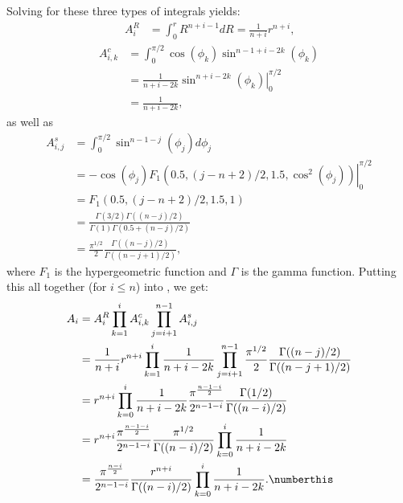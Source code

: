 Solving for these three types of integrals yields:
\begin{align*}
A^R_i &= \int_0^r R^{n+i-1} dR = \frac{1}{n+i} r^{n+i} \text{,}
\end{align*}
\begin{align*}
  A^c_{i,k} &= \int_0^{\pi/2} \cos(\phi_k)\sin^{n-1+i-2k}(\phi_k) \\
  	&= \frac{1}{n+i-2k} \left. \sin^{n+i-2k}(\phi_k)\right|_0^{\pi/2} \\
	&= \frac{1}{n+i-2k}  \text{,}
\end{align*}
as well as
\begin{align*}
  A^s_{i,j} &= \int_0^{\pi/2} \sin^{n-1-j}(\phi_j) d\phi_j \\
  	&= \left. -\cos(\phi_j)F_1(0.5,(j-n+2)/2, 1.5, \cos^2(\phi_j))\right|_0^{\pi/2} \\
	&= F_1(0.5,(j-n+2)/2, 1.5, 1) \\
	&= \frac{\Gamma(3/2)\Gamma((n-j)/2)}{\Gamma(1)\Gamma(0.5+(n-j)/2)}\\
	&= \frac{\pi^{1/2}}{2} \frac{\Gamma((n-j)/2)}{\Gamma((n-j+1)/2)}
       \text{,}
\end{align*}
where $F_1$ is the hypergeometric function and $\Gamma$ is the gamma function.
Putting this all together (for $i \le n$) into , we get:
\begin{align*}
  A_i &= A^R_i \prod_{k=1}^i A^c_{i,k}  \prod_{j=i+1}^{n-1} A^s_{i,j} \\
  	&=  \frac{1}{n+i} r^{n+i} \prod_{k=1}^i \frac{1}{n+i-2k}  \prod_{j=i+1}^{n-1} \frac{\pi^{1/2}}{2}\frac{\Gamma((n-j)/2)}{\Gamma((n-j+1)/2)} \\
	&=  r^{n+i} \prod_{k=0}^i \frac{1}{n+i-2k}  \frac{\pi^{\frac{n-1-i}{2}}}{2^{n-1-i}}\frac{\Gamma(1/2)}{\Gamma((n-i)/2)} \\
	&=  r^{n+i} \frac{\pi^\frac{n-1-i}{2}}{2^{n-1-i}}\frac{\pi^{1/2}}{\Gamma((n-i)/2)} \prod_{k=0}^i \frac{1}{n+i-2k} \\
	&=   \frac{\pi^\frac{n-i}{2}}{2^{n-1-i}}\frac{r^{n+i}}{\Gamma((n-i)/2)} \prod_{k=0}^i \frac{1}{n+i-2k}
    \text{.}
    \numberthis \label{eq:PreAi}
\end{align*}


